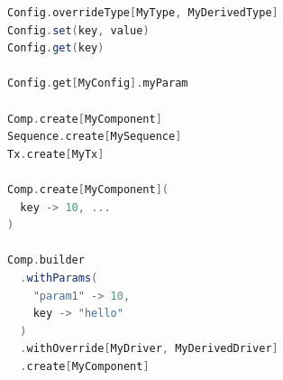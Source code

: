 \begin{listing}
\begin{lstlisting}[language=scala, captionpos=b, caption={Demonstration of the API for the four different factories for components, sequences, transactions and configuration objects.},label=lst:factory]
Config.overrideType[MyType, MyDerivedType]
Config.set(key, value)
Config.get(key)

Config.get[MyConfig].myParam

Comp.create[MyComponent]
Sequence.create[MySequence]
Tx.create[MyTx]

Comp.create[MyComponent](
  key -> 10, ...
)

Comp.builder
  .withParams(
    "param1" -> 10,
    key -> "hello"
  )
  .withOverride[MyDriver, MyDerivedDriver]
  .create[MyComponent]

\end{lstlisting}
\end{listing}



